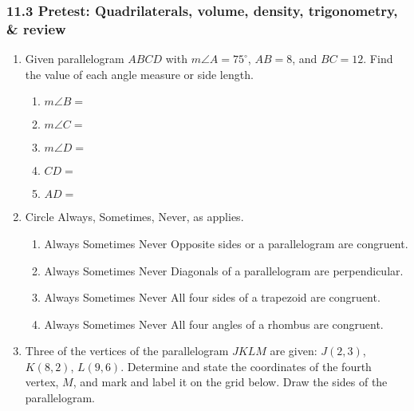 \documentclass[12pt, twoside]{article}
\begin{document}
\subsubsection*{11.3 Pretest: Quadrilaterals, volume, density, trigonometry, \& review}
 \begin{enumerate}

   \item Given parallelogram $ABCD$ with $m\angle A=75^\circ$, $AB=8$, and $BC=12$. Find the value of each angle measure or side length.
     \begin{enumerate}
       \item $m\angle B=$\vspace{0.5cm}
       \item $m\angle C=$\vspace{0.5cm}
       \item $m\angle D=$\vspace{0.5cm}
       \item $CD=$ \vspace{0.5cm}
       \item $AD=$ \vspace{0.5cm}
     \end{enumerate}

  \item Circle Always, Sometimes, Never, as applies.
    \begin{enumerate}
      \item Always \quad Sometimes \quad  Never \quad Opposite sides or a parallelogram are congruent.
      \item Always \quad Sometimes \quad  Never \quad Diagonals of a parallelogram are perpendicular.
      \item Always \quad Sometimes \quad  Never \quad All four sides of a trapezoid are congruent.
      \item Always \quad Sometimes \quad  Never \quad All four angles of a rhombus are congruent.
    \end{enumerate}

   \item Three of the vertices of the parallelogram $JKLM$ are given: $J(2, 3)$, $K(8,2)$, $L(9, 6)$. Determine and state the coordinates of the fourth vertex, $M$, and mark and label it on the grid below. Draw the sides of the parallelogram.
     \begin{center}
     \end{center}


\end{enumerate}
\end{document}
